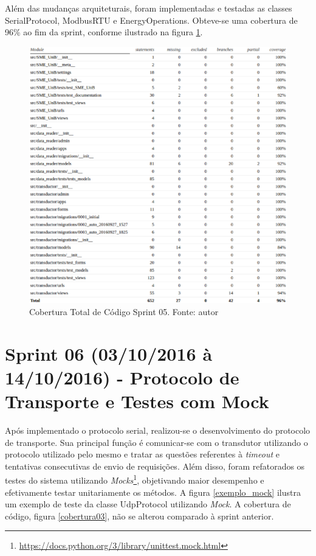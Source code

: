 Além das mudanças arquiteturais, foram implementadas e testadas as classes SerialProtocol, ModbusRTU e EnergyOperations. Obteve-se uma cobertura de 96\% ao fim da sprint, conforme ilustrado na figura \ref{cobertura02}.
\begin{figure}[!htpb]
    \centering
    \includegraphics[keepaspectratio=true,scale=0.6]{figuras/cobertura02.eps}
    \caption{Cobertura Total de Código Sprint 05. Fonte: autor}
    \label{cobertura02}
\end{figure}

\section{Sprint 06 (03/10/2016 à 14/10/2016) - Protocolo de Transporte e Testes com Mock}
Após implementado o protocolo serial, realizou-se o desenvolvimento do protocolo de transporte. Sua principal função é comunicar-se com o transdutor utilizando o protocolo utilizado pelo mesmo e tratar as questões referentes à \textit{timeout} e tentativas consecutivas de envio de requisições. Além disso, foram refatorados os testes do sistema utilizando \textit{Mocks}\footnote{\url{https://docs.python.org/3/library/unittest.mock.html}}, objetivando maior desempenho e efetivamente testar unitariamente os métodos. A figura \ref{exemplo_mock} ilustra um exemplo de teste da classe UdpProtocol utilizando \textit{Mock}. A cobertura de código, figura \ref{cobertura03}, não se alterou comparado à sprint anterior.

